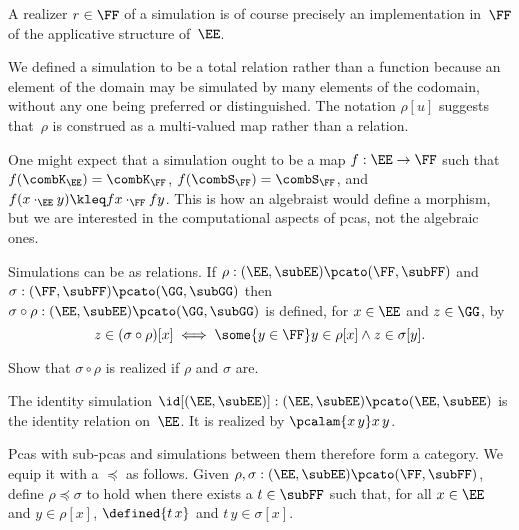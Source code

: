 A realizer $r \in \FF$ of a simulation is of course precisely an implementation in~$\FF$ of the applicative structure of~$\EE$.

We defined a simulation to be a total relation rather than a function because an element of the domain may be simulated by many elements of the codomain, without any one being preferred or distinguished. The notation $\rho[u]$ 
suggests that~$\rho$ is construed as a multi-valued map rather than a relation.

One might expect that a simulation ought to be a map $f : \EE \to \FF$ such that $f(\combK_\EE) = \combK_\FF$, $f(\combS_\FF) = \combS_\FF$, and $f (x \cdot_\EE y) \kleq f x \cdot_\FF f y$. This is how an algebraist would define a morphism, but we are interested in the computational aspects of pcas, not the algebraic ones.

%
%
%
Simulations can be  as relations.
If $\rho: (\EE, \subEE) \pcato (\FF, \subFF)$ and $\sigma: (\FF,
\subFF) \pcato (\GG, \subGG)$ then $\sigma \circ \rho: (\EE, \subEE)
\pcato (\GG, \subGG)$ is defined, for $x \in \EE$ and $z \in \GG$, by
%
\begin{equation*}
  z \in (\sigma \circ \rho)[x]
  \iff
  \some{y \in \FF} y \in \rho[x] \land z \in \sigma[y].
\end{equation*}

\begin{exercise}
  Show that $\sigma \circ \rho$ is realized if $\rho$ and $\sigma$ are.
\end{exercise}

The identity simulation $\id[(\EE, \subEE)]: (\EE,
\subEE) \pcato (\EE, \subEE)$ is the identity relation on~$\EE$. It is realized by $\pcalam{x\,y} x \, y$.

Pcas with sub-pcas and simulations between them therefore form a category. We equip it with a  $\preceq$ as follows.
%
%
%
%
%
Given $\rho, \sigma : (\EE, \subEE) \pcato (\FF, \subFF)$, define $\rho \preceq \sigma$ to hold when
there exists a  $t \in \subFF$ such that, for all $x \in \EE$ and $y \in \rho[x]$, $\defined{t \, x}$ and $t \, y \in \sigma[x]$.

